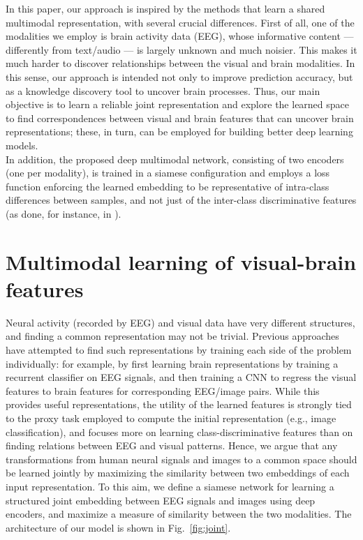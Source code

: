 \documentclass[10pt,journal,compsoc,twocolumn]{IEEEtran}
\begin{document}
In this paper, our approach is inspired by the methods that learn a shared multimodal representation, with several crucial differences. 
First of all, one of the modalities we employ is brain activity data (EEG), whose informative content --- differently from text/audio --- is largely unknown and much noisier. This makes it much harder to discover relationships between the visual and brain modalities. In this sense, our approach is intended not only to improve prediction accuracy, but as a knowledge discovery tool to uncover brain processes. Thus, our main objective is to learn a reliable joint representation and explore the learned space to find correspondences between visual and brain features that can uncover brain representations; these, in turn, can be employed for building better deep learning models. \\
In addition, the proposed deep multimodal network, consisting of two encoders (one per modality), is trained in a siamese configuration and employs a loss function enforcing the learned embedding to be representative of intra-class differences between samples, and not just of the inter-class discriminative features (as done, for instance, in \cite{pmlr-v48-reed16}).

\section{Multimodal learning of visual-brain features}\label{sec:joint}

Neural activity (recorded by EEG) and visual data have very different structures, and finding a common representation may not be trivial. Previous approaches \cite{Spampinato2016deep} have attempted to find such representations by training each side of the problem individually: for example, by first learning brain representations by training a recurrent classifier on EEG signals, and then training a CNN to regress the visual features to brain features for corresponding EEG/image pairs. While this provides useful representations, the utility of the learned features is strongly tied to the proxy task employed to compute the initial representation (e.g., image classification), and focuses more on learning class-discriminative features than on finding relations between EEG and visual patterns.
Hence, we argue that any transformations from human neural signals and images to a common space should be learned jointly by maximizing the similarity between two embeddings of each input representation. To this aim, we define a siamese network for learning a structured joint embedding between EEG signals and images using deep encoders, and maximize a measure of similarity between the two modalities. The architecture of our model is shown in Fig.~\ref{fig:joint}.
\end{document}

